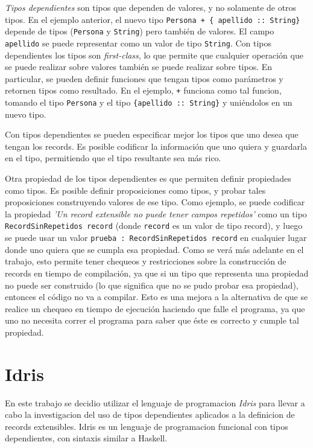 \textit{Tipos dependientes} son tipos que dependen de valores, y no solamente de otros tipos. En el ejemplo anterior, el nuevo tipo \texttt{Persona + \{ apellido :: String\}} depende de tipos (\texttt{Persona} y \texttt{String}) pero también de valores. El campo \texttt{apellido} se puede representar como un valor de tipo \texttt{String}. Con tipos dependientes los tipos son \textit{first-class}, lo que permite que cualquier operación que se puede realizar sobre valores también se puede realizar sobre tipos. En particular, se pueden definir funciones que tengan tipos como parámetros y retornen tipos como resultado. En el ejemplo, \texttt{+} funciona como tal funcion, tomando el tipo \texttt{Persona} y el tipo \texttt{\{apellido :: String\}} y uniéndolos en un nuevo tipo.

Con tipos dependientes se pueden especificar mejor los tipos que uno desea que tengan los records. Es posible codificar la información que uno quiera y guardarla en el tipo, permitiendo que el tipo resultante sea más rico. 

Otra propiedad de los tipos dependientes es que permiten definir propiedades como tipos. Es posible definir proposiciones como tipos, y probar tales proposiciones construyendo valores de ese tipo. Como ejemplo, se puede codificar la propiedad \textit{'Un record extensible no puede tener campos repetidos'} como un tipo \texttt{RecordSinRepetidos record} (donde \texttt{record} es un valor de tipo record), y luego se puede usar un valor \texttt{prueba : RecordSinRepetidos record} en cualquier lugar donde uno quiera que se cumpla esa propiedad. Como se verá más adelante en el trabajo, esto permite tener chequeos y restricciones sobre la construcción de records en tiempo de compilación, ya que si un tipo que representa una propiedad no puede ser construido (lo que significa que no se pudo probar esa propiedad), entonces el código no va a compilar. Esto es una mejora a la alternativa de que se realice un chequeo en tiempo de ejecución haciendo que falle el programa, ya que uno no necesita correr el programa para saber que éste es correcto y cumple tal propiedad.

\section{Idris}

En este trabajo se decidio utilizar el lenguaje de programacion \textit{Idris} \cite{brady:idris-jfp13} para llevar a cabo la investigacion del uso de tipos dependientes aplicados a la definicion de records extensibles. Idris es un lenguaje de programacion funcional con tipos dependientes, con sintaxis similar a Haskell.

